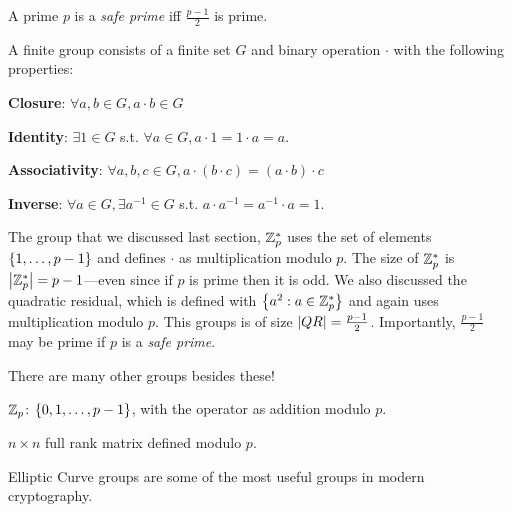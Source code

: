 \begin{definition}
	A prime $p$ is a \emph{safe prime} iff $\tfrac{p-1}{2}$ is prime.
\end{definition}

\begin{definition}
	A finite group consists of a finite set $G$ and binary operation $\cdot$ with the following properties:
	\begin{compactenum}
		\item \textbf{Closure}: $\forall a, b \in G, a \cdot b \in G$
		\item \textbf{Identity}: $\exists 1 \in G$  s.t. $\forall a \in G, a\cdot 1 = 1\cdot a = a$.
		\item \textbf{Associativity}: $\forall a, b, c \in G, a\cdot (b \cdot c) = (a \cdot b) \cdot c$
		\item \textbf{Inverse}: $\forall a \in G, \exists a^{-1} \in G$ s.t. $a\cdot a^{-1} = a^{-1}\cdot a = 1$.
	\end{compactenum}
\end{definition}

The group that we discussed last section, $\mathbb{Z}_p^*$ uses the set of elements $\left\{ 1, \ldots, p-1 \right\}$ and defines $\cdot$ as multiplication modulo $p$. The size of $\mathbb{Z}_p^*$ is $\left| \mathbb{Z}_p^* \right| = p-1$---even since if $p$ is prime then it is odd. We also discussed the quadratic residual, which is defined with $\left\{ a^2: a \in \mathbb{Z}_p^* \right\}$ and again uses multiplication modulo $p$. This groups is of size $\left| QR \right| = \tfrac{p-1}{2}$. Importantly, $\tfrac{p-1}{2}$ may be prime if $p$ is a \emph{safe prime}.

There are many other groups besides these!
\begin{compactitem}
\item $\mathbb{Z}_p$: $\left\{ 0, 1, \ldots, p-1 \right\}$, with the operator as addition modulo $p$.
\item $n \times n$ full rank matrix defined modulo $p$.
\item Elliptic Curve groups are some of the most useful groups in modern cryptography.
\end{compactitem}
\fi
